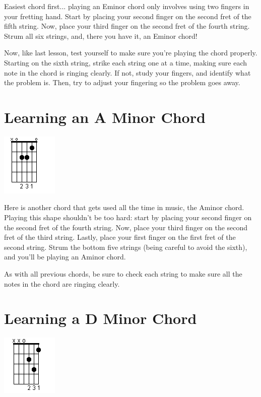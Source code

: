 Easiest chord first... playing an Eminor chord only involves using two fingers in your fretting hand. Start by placing your second finger on the second fret of the fifth string. Now, place your third finger on the second fret of the fourth string. Strum all six strings, and, there you have it, an Eminor chord!

Now, like last lesson, test yourself to make sure you're playing the chord properly. Starting on the sixth string, strike each string one at a time, making sure each note in the chord is ringing clearly. If not, study your fingers, and identify what the problem is. Then, try to adjust your fingering so the problem goes away.

\section{Learning an A Minor Chord}
\includegraphics{parttwo/openaminor.png}

Here is another chord that gets used all the time in music, the Aminor chord. Playing this shape shouldn't be too hard: start by placing your second finger on the second fret of the fourth string. Now, place your third finger on the second fret of the third string. Lastly, place your first finger on the first fret of the second string. Strum the bottom five strings (being careful to avoid the sixth), and you'll be playing an Aminor chord.

As with all previous chords, be sure to check each string to make sure all the notes in the chord are ringing clearly.

\section{Learning a D Minor Chord}
\includegraphics{parttwo/opendminor.png}

